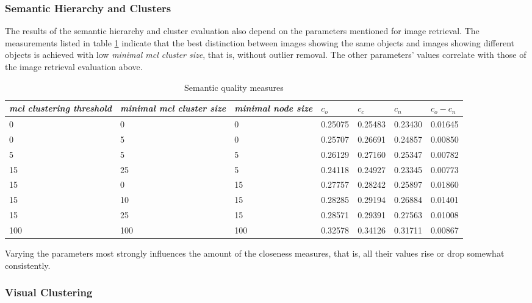 \subsubsection*{Semantic Hierarchy and Clusters}

The results of the semantic hierarchy and cluster evaluation also depend on the parameters mentioned for image retrieval. The measurements listed in table \ref{tab_treeevaluation} indicate that the best distinction between images showing the same objects and images showing different objects is achieved with low \emph{minimal mcl cluster size}, that is, without outlier removal. The other parameters' values correlate with those of the image retrieval evaluation above.\\

\begin{table}[h]
    \begin{tabular}{| p{2.2cm} | p{2.2cm} | p{2cm} || p{1.4cm} | p{1.4cm} | p{1.4cm} | p{1.4cm} |}
	\hline
    \emph{mcl clustering threshold} & \emph{minimal mcl cluster size}		& \emph{minimal node size} & $c_o $ & $c_c$ & $c_n$ & $c_o-c_n$ \\ \hline
    0 	& 0 	& 0 & 0.25075 & 0.25483 & 0.23430 & 0.01645 \\ \hline
    0 	& 5 	& 0 & 0.25707 & 0.26691 & 0.24857 & 0.00850 \\ \hline
    5 	& 5 	& 5 & 0.26129 & 0.27160 & 0.25347 & 0.00782 \\ \hline
    15 	& 25 &  5 & 0.24118 & 0.24927 & 0.23345 & 0.00773\\ \hline
    15 	& 0 & 15 & 0.27757 & 0.28242 & 0.25897 & 0.01860 \\ \hline
    15 	& 10 & 15 & 0.28285 & 0.29194 & 0.26884 & 0.01401 \\ \hline
    15 	& 25 & 15 & 0.28571 & 0.29391 & 0.27563 & 0.01008 \\ \hline
    	100 	& 100 & 100 & 0.32578 & 0.34126 & 0.31711 & 0.00867 \\ \hline
    \end{tabular}
    \caption{Semantic quality measures}
	\label{tab_treeevaluation}
\end{table}

Varying the parameters most strongly influences the amount of the closeness measures, that is, all their values rise or drop somewhat consistently.


\subsubsection*{Visual Clustering}

